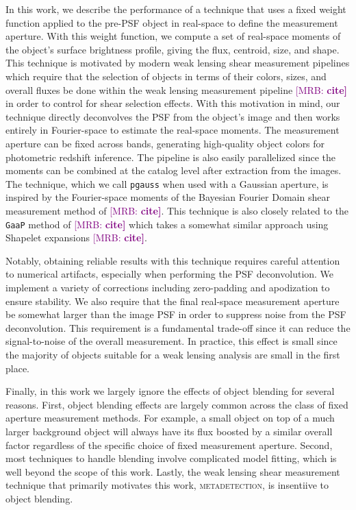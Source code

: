 \documentclass[twocolappendix, appendixfloats, numberedappendix, twocolumn, apj]{openjournal}
\newcommand{\mrb}[1]{\textcolor{purple}{[MRB: \bf #1]}\xspace}
\newcommand{\mdet}{\textsc{metadetection}\xspace}
\newcommand{\pgauss}{\texttt{pgauss}\xspace}
\begin{document}
In this work, we describe the performance of a technique that uses a fixed weight function applied to
the pre-PSF object in real-space to define the measurement aperture. With this weight function, we compute a set of
real-space moments of the object's surface brightness profile, giving the flux, centroid, size, and shape. This technique is
motivated by modern weak lensing shear measurement pipelines which require that the selection of objects
in terms of their colors, sizes, and overall fluxes be done within the weak lensing measurement pipeline
\mrb{cite} in order to control for shear selection effects. With this motivation in mind, our technique
directly deconvolves the PSF from the object's image and then works entirely in Fourier-space to estimate
the real-space moments. The measurement aperture can be fixed across bands, generating high-quality object
colors for photometric redshift inference. The pipeline is also easily parallelized since the moments can be combined
at the catalog level after extraction from the images. The technique, which we call \pgauss when used with a
Gaussian aperture, is inspired by the Fourier-space moments of the Bayesian Fourier Domain shear measurement
method of \mrb{cite}. This technique is also closely related to the \texttt{GaaP} method of \mrb{cite} which
takes a somewhat similar approach using Shapelet expansions \mrb{cite}.

Notably, obtaining reliable results with this technique requires careful attention to numerical
artifacts, especially when performing the PSF deconvolution. We implement a variety of corrections including
zero-padding and apodization to ensure stability. We also require that the final real-space measurement
aperture be somewhat larger than the image PSF in order to suppress noise from the PSF deconvolution. This
requirement is a fundamental trade-off since it can reduce the signal-to-noise of the overall measurement.
In practice, this effect is small since the majority of objects suitable for a weak lensing
analysis are small in the first place.

Finally, in this work we largely ignore the effects of object blending for several reasons. First,
object blending effects are largely common across the class of fixed aperture measurement methods.
For example, a small object on top of a much larger background object will always have its flux boosted
by a similar overall factor regardless of the specific choice of fixed measurement aperture. Second,
most techniques to handle blending involve complicated model fitting, which is well beyond the scope
of this work. Lastly, the weak lensing shear measurement technique that primarily motivates this work,
\mdet, is insentiive to object blending.
\end{document}
